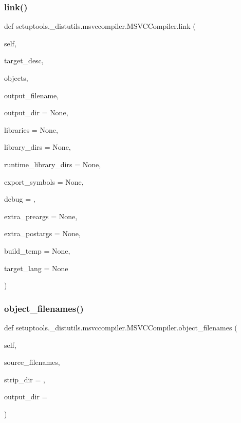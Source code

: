 \subsubsection{\texorpdfstring{link()}{link()}}
{\footnotesize\ttfamily def setuptools.\+\_\+distutils.\+msvccompiler.\+M\+S\+V\+C\+Compiler.\+link (\begin{DoxyParamCaption}\item[{}]{self,  }\item[{}]{target\+\_\+desc,  }\item[{}]{objects,  }\item[{}]{output\+\_\+filename,  }\item[{}]{output\+\_\+dir = {\ttfamily None},  }\item[{}]{libraries = {\ttfamily None},  }\item[{}]{library\+\_\+dirs = {\ttfamily None},  }\item[{}]{runtime\+\_\+library\+\_\+dirs = {\ttfamily None},  }\item[{}]{export\+\_\+symbols = {\ttfamily None},  }\item[{}]{debug = {},  }\item[{}]{extra\+\_\+preargs = {\ttfamily None},  }\item[{}]{extra\+\_\+postargs = {\ttfamily None},  }\item[{}]{build\+\_\+temp = {\ttfamily None},  }\item[{}]{target\+\_\+lang = {\ttfamily None} }\end{DoxyParamCaption})}

\mbox{\label{classsetuptools_1_1__distutils_1_1msvccompiler_1_1MSVCCompiler_ad4d065897899e5a1785f8aeed0ce928d}} 
\subsubsection{\texorpdfstring{object\+\_\+filenames()}{object\_filenames()}}
{\footnotesize\ttfamily def setuptools.\+\_\+distutils.\+msvccompiler.\+M\+S\+V\+C\+Compiler.\+object\+\_\+filenames (\begin{DoxyParamCaption}\item[{}]{self,  }\item[{}]{source\+\_\+filenames,  }\item[{}]{strip\+\_\+dir = {},  }\item[{}]{output\+\_\+dir = {\ttfamily \textquotesingle{}\textquotesingle{}} }\end{DoxyParamCaption})}

